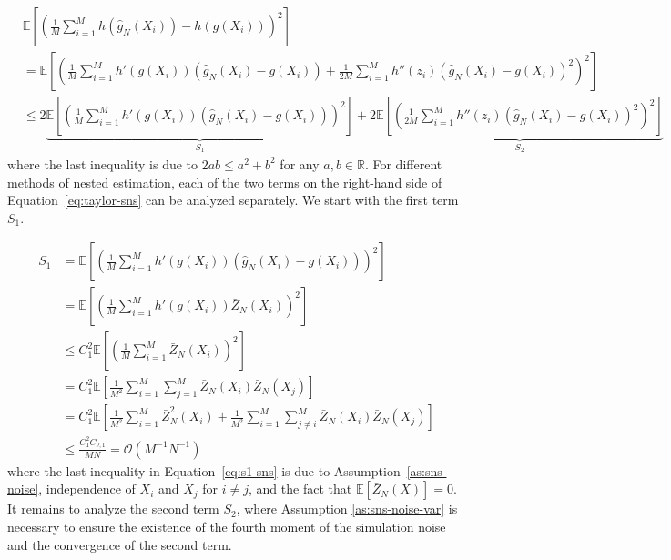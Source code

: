 \documentclass{article}
\begin{document}
\begin{align} \label{eq:taylor-sns}
    & \mathbb{E} \left[  \left( \frac{1}{M} \sum_{i=1}^M h\left( \hat{g}_{N}(X_i) \right) -  h\left(g(X_i) \right)  \right)^2\right] \nonumber \\
    & = \mathbb{E} \left[ \left( \frac{1}{M} \sum_{i=1}^M h'\left( g(X_i) \right) \left( \hat{g}_{N}(X_i) - g(X_i) \right) +  \frac{1}{2M} \sum_{i=1}^M h''\left( z_i \right) \left( \hat{g}_{N}(X_i) - g(X_i) \right)^2 \right)^2\right] \nonumber \\
    & \leq 2 \underbrace{\mathbb{E} \left[ \left( \frac{1}{M} \sum_{i=1}^M h'\left( g(X_i) \right) \left( \hat{g}_{ N}(X_i) - g(X_i) \right) \right)^2\right]}_{S_1} + 2 \underbrace{\mathbb{E} \left[ \left( \frac{1}{2M} \sum_{i=1}^M h''\left( z_i \right) \left( \hat{g}_{N}(X_i) - g(X_i) \right)^2 \right)^2\right]}_{S_2}
\end{align}
where the last inequality is due to $2ab \leq a^2 + b^2$ for any $a, b \in \mathbb{R}$. 
For different methods of nested estimation, each of the two terms on the right-hand side of Equation~\ref{eq:taylor-sns} can be analyzed separately.
We start with the first term $S_1$.


\begin{align} \label{eq:s1-sns}
    S_1 
    & = \mathbb{E} \left[ \left(\frac{1}{M} \sum_{i=1}^M h'\left( g(X_i) \right) \left( \hat{g}_{N}(X_i) - g(X_i) \right) \right)^2 \right] \nonumber \\
    & = \mathbb{E} \left[ \left(\frac{1}{M} \sum_{i=1}^M h'\left( g(X_i) \right) \bar{Z}_N(X_i) \right)^2 \right] \nonumber \\
    & \leq C_1^2 \mathbb{E} \left[ \left(\frac{1}{M} \sum_{i=1}^M \bar{Z}_N(X_i) \right)^2 \right] \nonumber \\
    & = C_1^2 \mathbb{E} \left[ \frac{1}{M^2} \sum_{i=1}^M \sum_{j=1}^M \bar{Z}_N(X_i) \bar{Z}_N(X_j) \right] \nonumber \\
    & = C_1^2 \mathbb{E} \left[ \frac{1}{M^2} \sum_{i=1}^M \bar{Z}_N^2(X_i) + \frac{1}{M^2} \sum_{i=1}^M \sum_{j \neq i}^M \bar{Z}_N(X_i) \bar{Z}_N(X_j) \right] \nonumber \\
    & \leq  \frac{C_1^2 C_{\nu, 1}}{MN} = \mathcal{O}(M^{-1} N^{-1})
\end{align}
where the last inequality in Equation~\ref{eq:s1-sns} is due to Assumption~\ref{as:sns-noise}, independence of $X_i$ and $X_j$ for $i \neq j$, and the fact that $\mathbb{E} \left[ \bar{Z}_N(X) \right] = 0$. 
It remains to analyze the second term $S_2$, where Assumption \ref{as:sns-noise-var} is necessary to ensure the existence of the fourth moment of the simulation noise and the convergence of the second term.
\end{document}
